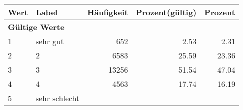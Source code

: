      \begin{longtable}{lXrrr}
     \toprule
     \textbf{Wert} & \textbf{Label} & \textbf{Häufigkeit} & \textbf{Prozent(gültig)} & \textbf{Prozent} \\
     \endhead
     \midrule
     \multicolumn{5}{l}{\textbf{Gültige Werte}}\\

     1 &
     \multicolumn{1}{X}{ sehr gut   } &


       \num{652} &
       \num[round-mode=places,round-precision=2]{2.53} &
         \num[round-mode=places,round-precision=2]{2.31} \\

     2 &
     \multicolumn{1}{X}{ 2   } &


       \num{6583} &
       \num[round-mode=places,round-precision=2]{25.59} &
         \num[round-mode=places,round-precision=2]{23.36} \\

     3 &
     \multicolumn{1}{X}{ 3   } &


       \num{13256} &
       \num[round-mode=places,round-precision=2]{51.54} &
         \num[round-mode=places,round-precision=2]{47.04} \\

     4 &
     \multicolumn{1}{X}{ 4   } &


       \num{4563} &
       \num[round-mode=places,round-precision=2]{17.74} &
         \num[round-mode=places,round-precision=2]{16.19} \\

     5 &
     \multicolumn{1}{X}{ sehr schlecht   } &



\end{longtable}
